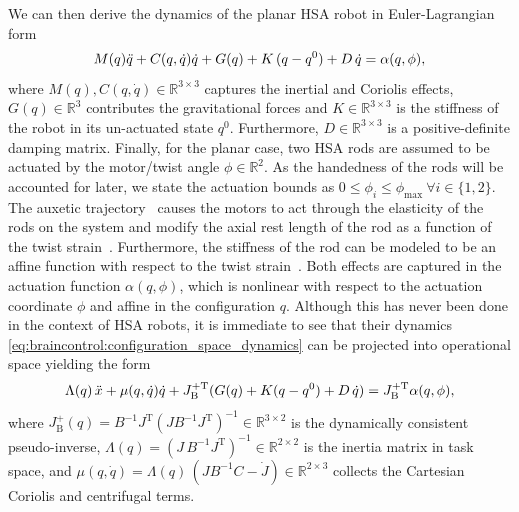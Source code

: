 \documentclass[letterpaper, 10pt, conference]{ieeeconf}      %
\begin{document}
We can then derive the dynamics of the planar \gls{HSA} robot in Euler-Lagrangian form
\begin{equation}\label{eq:braincontrol:configuration_space_dynamics}
    M(q) \Ddot{q} + C(q,\dot{q})\dot{q} + G(q) + K \, (q-q^0) + D \, \dot{q} = \alpha(q,\phi),
\end{equation}
where $M(q), C(q,\dot{q}) \in \mathbb{R}^{3 \times 3}$ captures the inertial and Coriolis effects, $G(q) \in \mathbb{R}^3$ contributes the gravitational forces and $K \in \mathbb{R}^{3 \times 3}$ is the stiffness of the robot in its un-actuated state $q^0$. Furthermore, $D \in \mathbb{R}^{3 \times 3}$ is a positive-definite damping matrix. Finally, for the planar case, two \gls{HSA} rods are assumed to be actuated by the motor/twist angle $\phi \in \mathbb{R}^2$. As the handedness of the rods will be accounted for later, we state the actuation bounds as $0 \leq \phi_i \leq \phi_\mathrm{max} \: \forall i \in \{ 1, 2 \}$.
The auxetic trajectory~\cite{good2022expanding} causes the motors to act through the elasticity of the rods on the system and modify the axial rest length of the rod as a function of the twist strain~\cite{stolzle2023modelling}.
Furthermore, the stiffness of the rod can be modeled to be an affine function with respect to the twist strain~\cite{good2022expanding, stolzle2023modelling}. Both effects are captured in the actuation function $\alpha(q,\phi)$, which is nonlinear with respect to the actuation coordinate $\phi$ and affine in the configuration $q$.
%
Although this has never been done in the context of HSA robots, it is immediate to see that their dynamics \eqref{eq:braincontrol:configuration_space_dynamics} can be projected into operational space yielding the form~\cite{della2019exact, della2020model} %
\begin{equation}\label{eq:braincontrol:operational_space_dynamics}
    \Lambda(q) \, \Ddot{x} + \mu(q,\dot{q}) \dot{q} + J_\mathrm{B}^{+\mathrm{T}} ( G(q) + K (q-q^0) + D \, \dot{q} ) = J_\mathrm{B}^{+\mathrm{T}} \alpha(q,\phi),
\end{equation}
where $J_\mathrm{B}^+(q) = B^{-1}J^\mathrm{T}(J B^{-1} J^\mathrm{T})^{-1} \in \mathbb{R}^{3\times2}$ is the dynamically consistent pseudo-inverse, $\Lambda(q) = (J \, B^{-1} J^\mathrm{T})^{-1} \in \mathbb{R}^{2 \times 2}$ is the inertia matrix in task space, and $\mu(q, \dot{q}) = \Lambda(q) \, (J B^{-1} C - \dot{J}) \in \mathbb{R}^{2 \times 3}$ collects the Cartesian Coriolis and centrifugal terms. %
\end{document}
